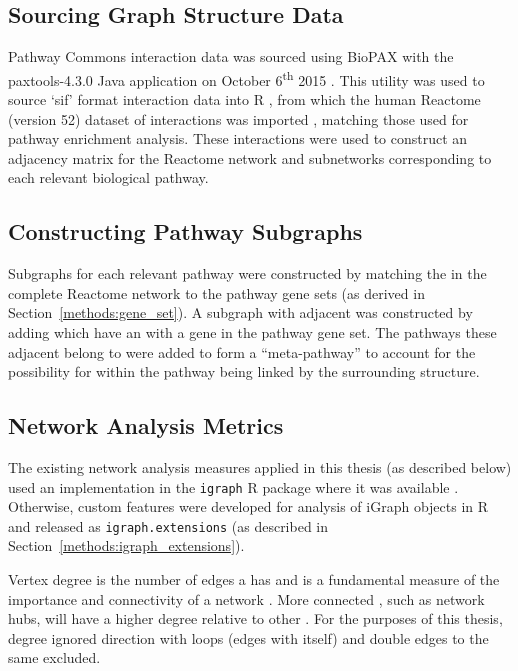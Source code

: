 \subsection{Sourcing Graph Structure Data} \label{methods:graph_data}
Pathway Commons interaction data was sourced using \gls{BioPAX} with the paxtools-4.3.0 Java application on October 6\textsuperscript{th} 2015 \citep{PathwayCommons, paxtools}. This utility was used to source `sif' format interaction data into R \citep{R_core}, from which the human Reactome (version 52) dataset of interactions was imported \citep{Reactome}, matching those used for \gls{pathway} enrichment analysis. These interactions were used to construct an adjacency matrix for the Reactome network and subnetworks corresponding to each relevant biological \gls{pathway}. 

\subsection{Constructing Pathway Subgraphs} \label{methods:subgraphs}
Subgraphs for each relevant \gls{pathway} were constructed by matching the  in the complete Reactome network to the \gls{pathway} gene sets (as derived in Section~\ref{methods:gene_set}). A subgraph with adjacent  was constructed by adding  which have an  with a gene in the \gls{pathway} gene set. The \glspl{pathway} these adjacent  belong to were added to form a ``meta-\gls{pathway}'' to account for the possibility for  within the \gls{pathway} being linked by the surrounding  structure.

\subsection{Network Analysis Metrics} \label{methods:network_metrics}
The existing network analysis measures applied in this thesis (as described below) used an implementation in the \texttt{igraph} R package where it was available \citep{igraph}. Otherwise, custom features were developed for analysis of iGraph objects in R and released as \texttt{igraph.extensions} (as described in Section~\ref{methods:igraph_extensions}).

Vertex degree is the number of \glspl{edge} a  has and is a fundamental measure of the importance and connectivity of a network \citep{vanSteen2010}. More connected , such as network hubs, will have a higher  degree relative to other . For the purposes of this thesis,  degree ignored  direction with loops (edges with itself) and double \glspl{edge} to the same  excluded.

